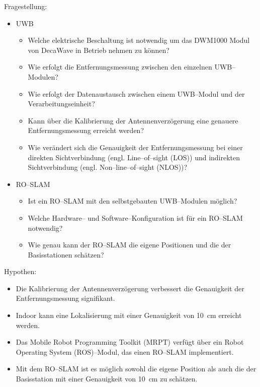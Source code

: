 Fragestellung:
\begin{itemize}
	\item UWB
	\begin{itemize}
		\item Welche elektrische Beschaltung ist notwendig um das DWM1000 Modul von DecaWave in Betrieb nehmen zu können?
		\item Wie erfolgt die Entfernungsmessung zwischen den einzelnen UWB--Modulen?
		\item Wie erfolgt der Datenaustausch zwischen einem UWB--Modul und der Verarbeitungseinheit?
		\item Kann über die Kalibrierung der Antennenverzögerung eine genauere Entfernungsmessung erreicht werden?
		\item Wie verändert sich die Genauigkeit der Entfernungsmessung bei einer direkten Sichtverbindung (engl. Line--of--sight (LOS)) und indirekten Sichtverbindung (engl. Non--line--of--sight (NLOS))?
	\end{itemize}
	\item RO--SLAM
	\begin{itemize}
		\item Ist ein RO--SLAM mit den selbstgebauten UWB--Modulen möglich?
		\item Welche Hardware-- und Software--Konfiguration ist für ein RO--SLAM notwendig?
		\item Wie genau kann der RO--SLAM die eigene Positionen und die der Basisstationen schätzen?
	\end{itemize}
\end{itemize}

Hypothen:
\begin{itemize}
	\item Die Kalibrierung der Antennenverzögerung verbessert die Genauigkeit der Entfernungsmessung signifikant.
	\item Indoor kann eine Lokalisierung mit einer Genauigkeit von \SI{10}{\cm} erreicht werden.
	\item Das Mobile Robot Programming Toolkit (MRPT) verfügt über ein Robot Operating System (ROS)--Modul, das einen RO--SLAM implementiert.
	\item Mit dem RO--SLAM ist es möglich sowohl die eigene Position als auch die der Basisstation mit einer Genauigkeit von \SI{10}{\cm} zu schätzen.
\end{itemize}

